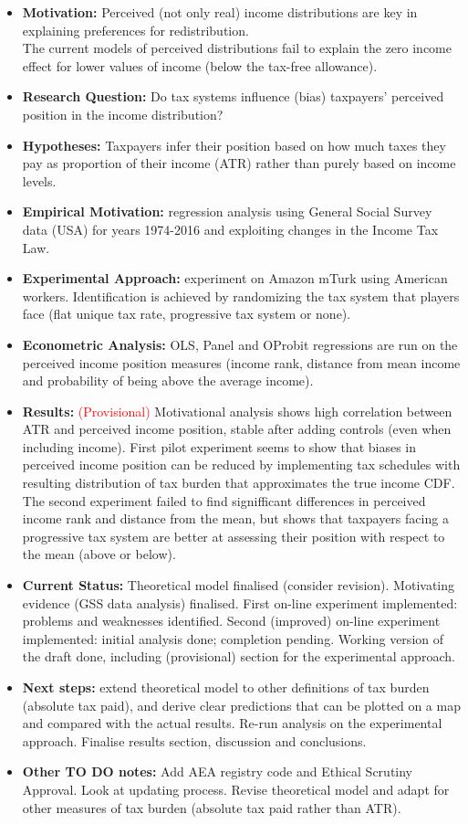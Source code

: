 \documentclass[12pt]{article}%
\begin{document}
\begin{itemize}
	\item \textbf{Motivation:} Perceived (not only real) income distributions are key in explaining preferences for redistribution. \\ The current models of perceived distributions fail to explain the zero income effect for lower values of income (below the tax-free allowance).
	\item \textbf{Research Question:} Do tax systems influence (bias) taxpayers’ perceived position in the income distribution?
	\item \textbf{Hypotheses:} Taxpayers infer their position based on how much taxes they pay as proportion of their income (ATR) rather than purely based on income levels.
	\item \textbf{Empirical Motivation:} regression analysis using General Social Survey data (USA)  for years 1974-2016 and exploiting changes in the Income Tax Law.
	\item \textbf{Experimental Approach:} experiment on Amazon mTurk using American workers. Identification is achieved by randomizing the tax system that players face (flat unique tax rate, progressive tax system or none).
	\item \textbf{Econometric Analysis:} OLS, Panel and OProbit regressions are run on the perceived income position measures (income rank, distance from mean income and probability of being above the average income).
	\item \textbf{Results:} \textcolor{red}{(Provisional)} Motivational analysis shows high correlation between ATR and perceived income position, stable after adding controls (even when including income). First pilot experiment seems to show that biases in perceived income position can be reduced by implementing tax schedules with resulting distribution of tax burden that approximates the true income CDF. The second experiment failed to find signifficant differences in perceived income rank and distance from the mean, but shows that taxpayers facing a progressive tax system are better at assessing their position with respect to the mean (above or below).
	\item \textbf{Current Status:} Theoretical model finalised (consider revision). Motivating evidence (GSS data analysis) finalised. First on-line experiment implemented: problems and weaknesses identified. Second (improved) on-line experiment implemented: initial analysis done; completion pending. Working version of the draft done, including (provisional) section for the experimental approach.
	\item \textbf{Next steps:} extend theoretical model to other definitions of tax burden (absolute tax paid), and derive clear predictions that can be plotted on a map and compared with the actual results. Re-run analysis on the experimental approach. Finalise results section, discussion and conclusions.
	\item \textbf{Other TO DO notes:} Add AEA registry code and Ethical Scrutiny Approval. Look at updating process. Revise theoretical model and adapt for other measures of tax burden (absolute tax paid rather than ATR).
\end{itemize}
\end{document}
